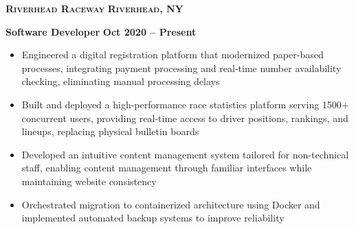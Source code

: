 \documentclass{article}
\newcommand{\textscbf}[1]{\textbf{\textsc{#1}}}
\begin{document}
\textscbf{Riverhead Raceway} \hfill \textscbf{Riverhead, NY}

\textbf{Software Developer} \hfill \textbf{Oct 2020 – Present}
\begin{itemize}[noitemsep,topsep=2pt]
\item Engineered a digital registration platform that modernized paper-based processes, integrating payment processing and real-time number availability checking, eliminating manual processing delays
\item Built and deployed a high-performance race statistics platform serving 1500+ concurrent users, providing real-time access to driver positions, rankings, and lineups, replacing physical bulletin boards
\item Developed an intuitive content management system tailored for non-technical staff, enabling content management through familiar interfaces while maintaining website consistency
\item Orchestrated migration to containerized architecture using Docker and implemented automated backup systems to improve reliability
\end{itemize}

%
%
%
%
\end{document}
